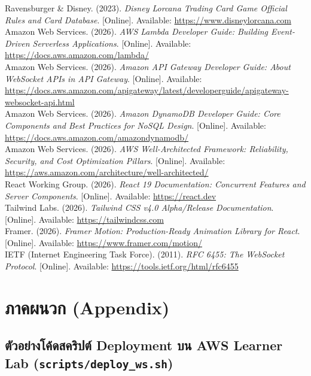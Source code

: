 \documentclass[12pt,a4paper]{report}
\begin{document}
\noindent [1] Ravensburger \& Disney. (2023). \textit{Disney Lorcana Trading Card Game Official Rules and Card Database}. [Online]. Available: \url{https://www.disneylorcana.com}\\[0.3cm]
\noindent [2] Amazon Web Services. (2026). \textit{AWS Lambda Developer Guide: Building Event-Driven Serverless Applications}. [Online]. Available: \url{https://docs.aws.amazon.com/lambda/}\\[0.3cm]
\noindent [3] Amazon Web Services. (2026). \textit{Amazon API Gateway Developer Guide: About WebSocket APIs in API Gateway}. [Online]. Available: \url{https://docs.aws.amazon.com/apigateway/latest/developerguide/apigateway-websocket-api.html}\\[0.3cm]
\noindent [4] Amazon Web Services. (2026). \textit{Amazon DynamoDB Developer Guide: Core Components and Best Practices for NoSQL Design}. [Online]. Available: \url{https://docs.aws.amazon.com/amazondynamodb/}\\[0.3cm]
\noindent [5] Amazon Web Services. (2026). \textit{AWS Well-Architected Framework: Reliability, Security, and Cost Optimization Pillars}. [Online]. Available: \url{https://aws.amazon.com/architecture/well-architected/}\\[0.3cm]
\noindent [6] React Working Group. (2026). \textit{React 19 Documentation: Concurrent Features and Server Components}. [Online]. Available: \url{https://react.dev}\\[0.3cm]
\noindent [7] Tailwind Labs. (2026). \textit{Tailwind CSS v4.0 Alpha/Release Documentation}. [Online]. Available: \url{https://tailwindcss.com}\\[0.3cm]
\noindent [8] Framer. (2026). \textit{Framer Motion: Production-Ready Animation Library for React}. [Online]. Available: \url{https://www.framer.com/motion/}\\[0.3cm]
\noindent [9] IETF (Internet Engineering Task Force). (2011). \textit{RFC 6455: The WebSocket Protocol}. [Online]. Available: \url{https://tools.ietf.org/html/rfc6455}

\chapter*{ภาคผนวก (Appendix)}

\section*{ตัวอย่างโค้ดสคริปต์ Deployment บน AWS Learner Lab (\texttt{scripts/deploy\_ws.sh})}
\end{document}
